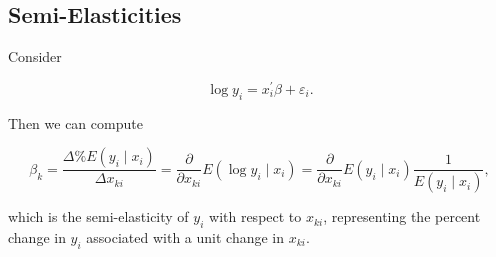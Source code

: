 \subsection{Semi-Elasticities}
Consider

$$
\log y_{i}=x_{i}^{\prime} \beta+\varepsilon_{i} .
$$

Then we can compute

$$
\beta_{k}=\frac{\Delta \% E\left(y_{i} \mid x_{i}\right)}{\Delta x_{k i}}=\frac{\partial}{\partial x_{k i}} E\left(\log y_{i} \mid x_{i}\right)=\frac{\partial}{\partial x_{k i}} E\left(y_{i} \mid x_{i}\right) \frac{1}{E\left(y_{i} \mid x_{i}\right)},
$$

which is the semi-elasticity of $y_{i}$ with respect to $x_{k i}$, representing the percent change in $y_{i}$ associated with a unit change in $x_{k i}$.

